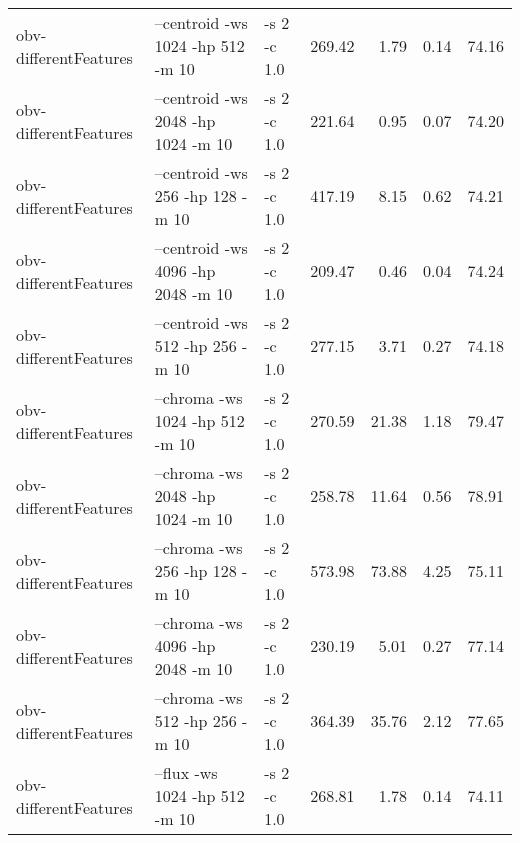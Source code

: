\documentclass[11pt,a4paper]{article}
\begin{document}
\begin{tabular}{lllrrrr}
 obv-differentFeatures  &  --centroid -ws 1024 -hp 512 -m 10                                                                                  &  -s 2 -c 1.0  &   269.42  &    1.79  &   0.14  &  74.16  \\
 obv-differentFeatures  &  --centroid -ws 2048 -hp 1024 -m 10                                                                                 &  -s 2 -c 1.0  &   221.64  &    0.95  &   0.07  &  74.20  \\
 obv-differentFeatures  &  --centroid -ws 256 -hp 128 -m 10                                                                                   &  -s 2 -c 1.0  &   417.19  &    8.15  &   0.62  &  74.21  \\
 obv-differentFeatures  &  --centroid -ws 4096 -hp 2048 -m 10                                                                                 &  -s 2 -c 1.0  &   209.47  &    0.46  &   0.04  &  74.24  \\
 obv-differentFeatures  &  --centroid -ws 512 -hp 256 -m 10                                                                                   &  -s 2 -c 1.0  &   277.15  &    3.71  &   0.27  &  74.18  \\
 obv-differentFeatures  &  --chroma -ws 1024 -hp 512 -m 10                                                                                    &  -s 2 -c 1.0  &   270.59  &   21.38  &   1.18  &  79.47  \\
 obv-differentFeatures  &  --chroma -ws 2048 -hp 1024 -m 10                                                                                   &  -s 2 -c 1.0  &   258.78  &   11.64  &   0.56  &  78.91  \\
 obv-differentFeatures  &  --chroma -ws 256 -hp 128 -m 10                                                                                     &  -s 2 -c 1.0  &   573.98  &   73.88  &   4.25  &  75.11  \\
 obv-differentFeatures  &  --chroma -ws 4096 -hp 2048 -m 10                                                                                   &  -s 2 -c 1.0  &   230.19  &    5.01  &   0.27  &  77.14  \\
 obv-differentFeatures  &  --chroma -ws 512 -hp 256 -m 10                                                                                     &  -s 2 -c 1.0  &   364.39  &   35.76  &   2.12  &  77.65  \\
 obv-differentFeatures  &  --flux -ws 1024 -hp 512 -m 10                                                                                      &  -s 2 -c 1.0  &   268.81  &    1.78  &   0.14  &  74.11  \\

\end{tabular}
\end{document}
